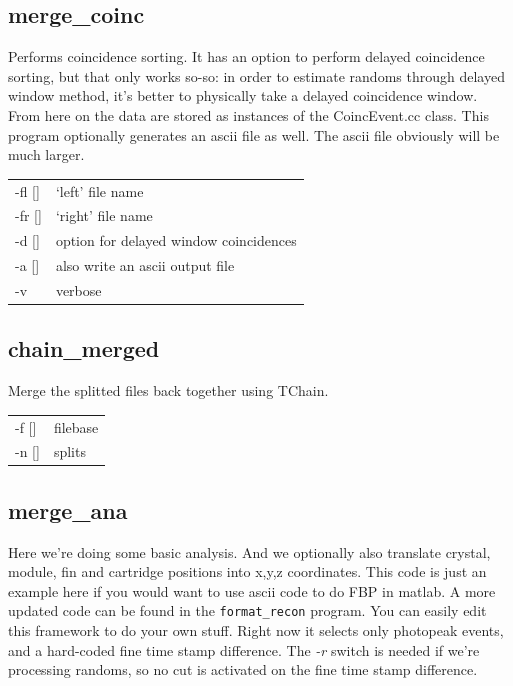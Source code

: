 \documentclass[12pt]{article}
\begin{document}
\subsection{merge\_coinc}
Performs coincidence sorting. It has an option to perform delayed coincidence sorting, but that only works so-so: in order to estimate randoms through delayed window method, it's better to physically take a delayed coincidence window. From here on the data are stored as instances of the CoincEvent.cc class. This program optionally generates an ascii file as well. The ascii file obviously will be much larger.\\

\begin{tabular}{ll}
-fl [] & `left' file name\\
-fr [] & `right' file name\\
-d [] & option for delayed window coincidences\\
-a [] & also write an ascii output file\\
-v & verbose\\
\end{tabular}

\subsection{chain\_merged}
Merge the splitted files back together using TChain.\\

\begin{tabular}{ll}
-f [] & filebase\\
-n [] & splits\\
\end{tabular}

\subsection{merge\_ana}
Here we're doing some basic analysis. And we optionally also translate crystal, module, fin and cartridge positions into x,y,z coordinates. This code is just an example here if you would want to use ascii code to do FBP in matlab. A more updated code can be found in the {\tt format\_recon} program. You can easily edit this framework to do your own stuff. Right now it selects only photopeak events, and a hard-coded fine time stamp difference. The {\em -r} switch is needed if we're processing randoms, so no cut is activated on the fine time stamp difference. \\
\end{document}
